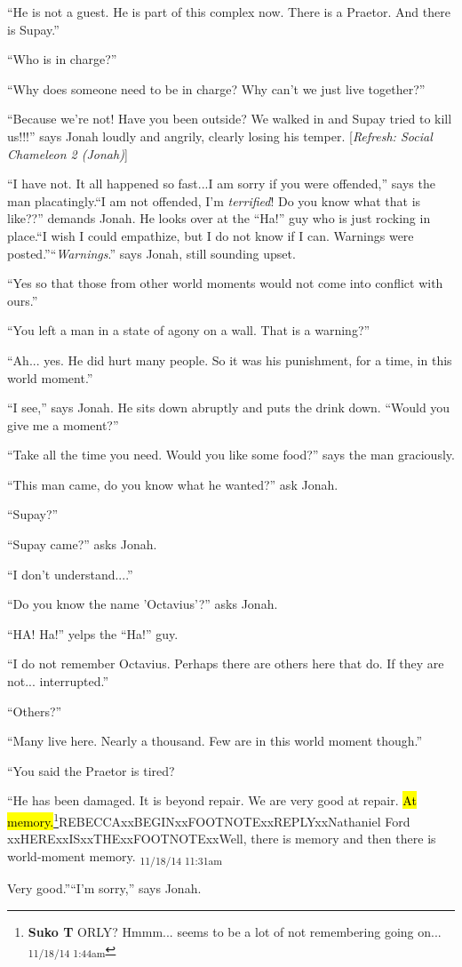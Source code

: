 {``He is not a guest.  He is part of this complex now.  There is a Praetor.  And there is Supay.''

``Who is in charge?''

``Why does someone need to be in charge?  Why can't we just live together?''

``Because we're not!  Have you been outside? We walked in and Supay tried to kill us!!!'' says Jonah loudly and angrily, clearly losing his temper. {[}\textit{Refresh: Social Chameleon 2 (Jonah)}{]}

``I have not. It all happened so fast...I am sorry if you were offended,'' says the man placatingly.``I am not offended, I'm \textit{terrified}!  Do you know what that is like??'' demands Jonah.  He looks over at the ``Ha!'' guy who is just rocking in place.``I wish I could empathize, but I do not know if I can. Warnings were posted.''``\textit{Warnings}.'' says Jonah, still sounding upset.

``Yes so that those from other world moments would not come into conflict with ours.''

``You left a man in a state of agony on a wall.  That is a warning?''

``Ah... yes.  He did hurt many people.  So it was his punishment, for a time, in this world moment.''

``I see,'' says Jonah.  He sits down abruptly and puts the drink down.  ``Would you give me a moment?''

``Take all the time you need.  Would you like some food?'' says the man graciously.

``This man came, do you know what he wanted?'' ask Jonah.

``Supay?''

``Supay came?'' asks Jonah.

``I don't understand....''

``Do you know the name 'Octavius'?'' asks Jonah.

``HA!  Ha!'' yelps the ``Ha!'' guy.

``I do not remember Octavius. Perhaps there are others here that do.  If they are not... interrupted.''

``Others?''

``Many live here.  Nearly a thousand.  Few are in this world moment though.''

``You said the Praetor is tired?

``He has been damaged.  It is beyond repair.  We are very good at repair.  \hl{At memory.}\footnote{\textbf{Suko T }ORLY?  Hmmm... seems to be a lot of not remembering going on... \textsubscript{11/18/14 1:44am}}REBECCAxxBEGINxxFOOTNOTExxREPLYxxNathaniel Ford xxHERExxISxxTHExxFOOTNOTExxWell, there is memory and then there is world-moment memory. \textsubscript{11/18/14 11:31am}}  Very good.''``I'm sorry,'' says Jonah.

